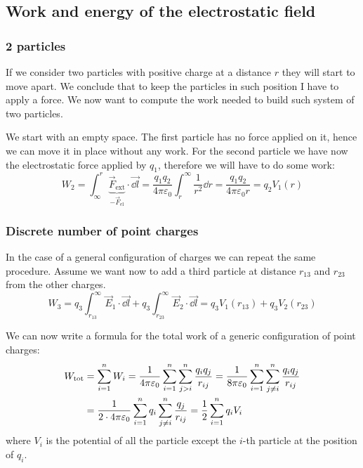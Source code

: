 \documentclass[12pt]{extarticle}
\begin{document}
\subsection{Work and energy of the electrostatic field}

\subsubsection{2 particles}

If we consider two particles with positive charge at a distance $r$ they will start to move apart.
We conclude that to keep the particles in such position I have to apply a force.
We now want to compute the work needed to build such system of two particles.

We start with an empty space.
The first particle has no force applied on it, hence we can move it in place without any work.
For the second particle we have now the electrostatic force applied by $q_1$, therefore we will have to do some work:
\begin{equation}
	W_2 = \int_\infty^r \underbrace{\vec F_\text{ext}}_{-\vec F_\text{el}} \cdot \vec{\dd{l}} = \frac{q_1 q_2}{4 \pi \varepsilon_0} \int_r^\infty \frac{1}{r^2} \dd{r} = \frac{q_1 q_2}{4 \pi \varepsilon_0 r} = q_2 V_1(r)
\end{equation}

\subsubsection{Discrete number of point charges}

In the case of a general configuration of charges we can repeat the same procedure.
Assume we want now to add a third particle at distance $r_{13}$ and $r_{23}$ from the other charges.
\begin{equation}
	W_3 = q_3 \int_{r_{13}}^\infty \vec E_1 \cdot \vec{\dd{l}} + q_3 \int_{r_{23}}^\infty \vec E_2 \cdot \vec{\dd{l}} = q_3V_1(r_{13}) + q_3 V_2(r_{23})
\end{equation}

We can now write a formula for the total work of a generic configuration of point charges:
\begin{align}
	W_\text{tot} & = \sum^n_{i = 1} W_i = \frac{1}{4 \pi \varepsilon_0} \sum^n_{i = 1} \sum_{j > i}^n \frac{q_i q_j}{r_{ij}} = \frac{1}{8 \pi \varepsilon_0} \sum^n_{i = 1} \sum_{j \ne i}^n \frac{q_i q_j}{r_{ij}} \\
	             & = \frac{1}{2 \cdot 4 \pi \varepsilon_0} \sum^n_{i = 1} q_i \sum_{j \ne i}^n \frac{ q_j}{r_{ij}} = \frac{1}{2} \sum_{i = 1}^n q_i V_i
\end{align}
where $V_i$ is the potential of all the particle except the $i$-th particle at the position of $q_i$.
\end{document}
